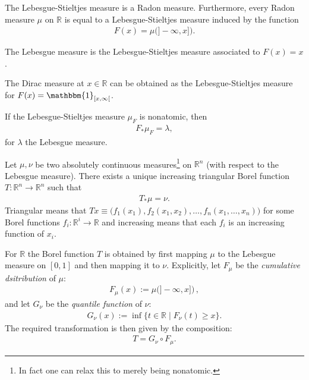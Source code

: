     \begin{property}[Regularity]
        The Lebesgue-Stieltjes measure is a Radon measure. Furthermore, every Radon measure $\mu$ on $\mathbb{R}$ is equal to a Lebesgue-Stieltjes measure induced by the function
        \begin{gather}
            F(x) = \mu\big(]-\!\infty,x]\big).
        \end{gather}
    \end{property}

    \begin{example}
        The Lebesgue measure is the Lebesgue-Stieltjes measure associated to $F(x)=x$.
    \end{example}
    \begin{example}
        The Dirac measure at $x\in\mathbb{R}$ can be obtained as the Lebesgue-Stieltjes measure for $F(x)=\mathbbm{1}_{[x,\infty[}$.
    \end{example}

    \begin{property}
        If the Lebesgue-Stieltjes measure $\mu_F$ is nonatomic, then
        \begin{gather}
            F_\ast\mu_F = \lambda,
        \end{gather}
        for $\lambda$ the Lebesgue measure.
    \end{property}

    \begin{property}
        Let $\mu,\nu$ be two absolutely continuous measures\footnote{In fact  one can relax this to merely being nonatomic.} on $\mathbb{R}^n$ (with respect to the Lebesgue measure). There exists a unique increasing triangular Borel function $T:\mathbb{R}^n\rightarrow\mathbb{R}^n$ such that
        \begin{gather}
            T_\ast\mu = \nu.
        \end{gather}
        Triangular means that $Tx\equiv\big(f_1(x_1),f_2(x_1,x_2),\ldots,f_n(x_1,\ldots,x_n)\big)$ for some Borel functions $f_i:\mathbb{R}^i\rightarrow\mathbb{R}$ and increasing means that each $f_i$ is an increasing function of $x_i$.
    \end{property}
    \begin{remark}
        For $\mathbb{R}$ the Borel function $T$ is obtained by first mapping $\mu$ to the Lebesgue measure on $[0,1]$ and then mapping it to $\nu$. Explicitly, let $F_\mu$ be the \textit{cumulative dsitribution} of $\mu$:
        \begin{gather}
            F_\mu(x) := \mu\big(]-\infty,x]\big)\,,
        \end{gather}
        and let $G_\nu$ be the \textit{quantile function} of $\nu$:
        \begin{gather}
            G_\nu(x) := \inf\{t\in\mathbb{R}\mid F_\nu(t)\geq x\}.
        \end{gather}
        The required transformation is then given by the composition:
        \begin{gather}
            T = G_\nu\circ F_\mu.
        \end{gather}
    \end{remark}

